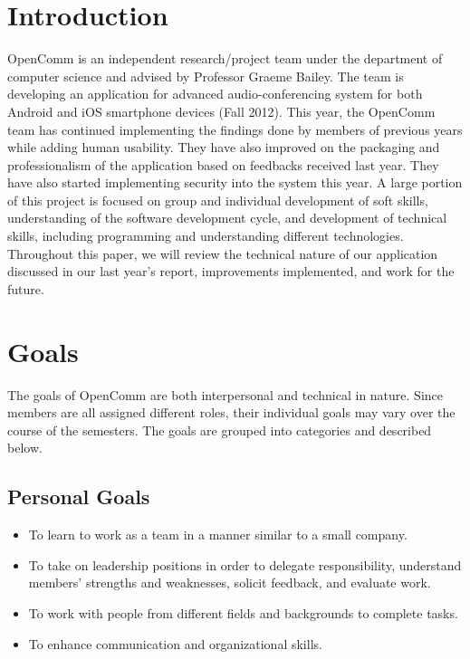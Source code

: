 \documentclass[12pt, letterpaper]{article}
\begin{document}
\maketitle

\thispagestyle{empty}

\section{Introduction}
OpenComm is an independent research/project team under the department of computer science and advised by Professor Graeme Bailey. The team is developing an application for advanced audio-conferencing system for both Android and iOS smartphone devices (Fall 2012). This year, the OpenComm team has continued implementing the findings done by members of previous years while adding human usability. They have also improved on the packaging and professionalism of the application based on feedbacks received last year. They have also started implementing security into the system this year. A large portion of this project is focused on group and individual development of soft skills, understanding of the software development cycle, and development of technical skills, including programming and understanding different technologies. Throughout this paper, we will review the technical nature of our application discussed in our last year’s report, improvements implemented, and work for the future.

\section{Goals}
The goals of OpenComm are both interpersonal and technical in nature. Since members are all assigned different roles, their individual goals may vary over the course of the semesters. The goals are grouped into categories and described below.

\subsection{Personal Goals}
\begin{itemize}
\item To learn to work as a team in a manner similar to a small company.
\item To take on leadership positions in order to delegate responsibility, understand members’ strengths and weaknesses, solicit feedback, and evaluate work.
\item To work with people from different fields and backgrounds to complete tasks.
\item To enhance communication and organizational skills.
\end{itemize}
\end{document}
